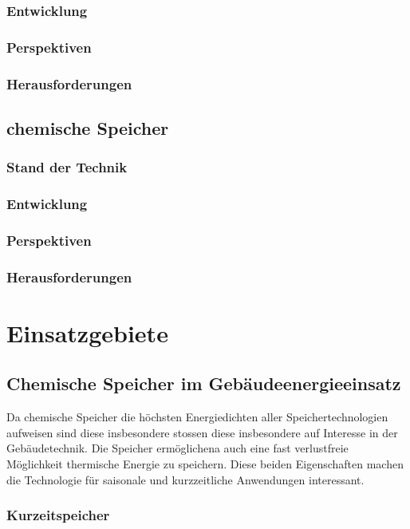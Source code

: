 \documentclass[11pt,a4paper]{scrartcl}
\begin{document}
\subsubsection{Entwicklung}
\subsubsection{Perspektiven}
\subsubsection{Herausforderungen}
\subsection{chemische Speicher}
\subsubsection{Stand der Technik}
\subsubsection{Entwicklung}
\subsubsection{Perspektiven}
\subsubsection{Herausforderungen}


\newpage
\section{Einsatzgebiete}
\subsection{Chemische Speicher im Gebäudeenergieeinsatz}
Da chemische Speicher die höchsten Energiedichten aller Speichertechnologien
aufweisen sind diese insbesondere stossen diese insbesondere auf Interesse in
der Gebäudetechnik. Die Speicher ermöglichena auch eine fast verlustfreie
Möglichkeit thermische Energie zu speichern. Diese beiden Eigenschaften machen
die Technologie für saisonale und kurzzeitliche Anwendungen interessant.

\subsubsection{Kurzeitspeicher}
\end{document}
